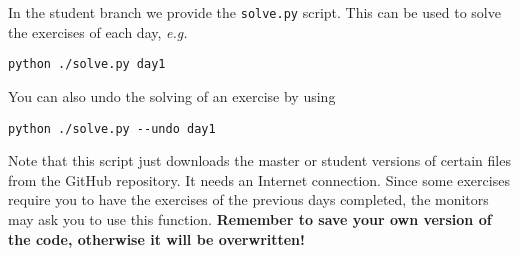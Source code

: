 In the student branch we provide the \verb+solve.py+ script. This can be used
to solve the exercises of each day, \emph{e.g.}

\begin{verbatim}
python ./solve.py day1
\end{verbatim}

\noindent You can also undo the solving of an exercise by using

\begin{verbatim}
python ./solve.py --undo day1
\end{verbatim}

Note that this script just downloads the master or student versions of certain
files from the GitHub repository. It needs an Internet connection. Since some
exercises require you to have the exercises of the previous days completed, the
monitors may ask you to use this function. \textbf{Remember to save your own
version of the code, otherwise it will be overwritten!}
